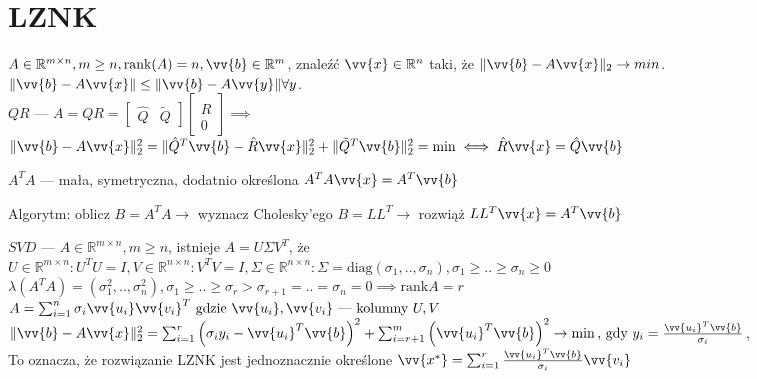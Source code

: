 \section{LZNK}
$A \in \mathbb{R}^{m \times n},m \ge n, \text{rank}(A)=n, \vv{b} \in \mathbb{R}^m$, znaleźć $\vv{x} \in \mathbb{R}^n$ taki, że $\lVert \vv{b} - A\vv{x} \rVert_2 \to min$.\\
$\lVert \vv{b} - A\vv{x} \rVert \le \lVert \vv{b} - A\vv{y} \rVert \forall y$.\\
\entry
$QR$ ---
$
A = QR = 
\begin{bmatrix}
  \hat{Q} & \tilde{Q}
\end{bmatrix}
\begin{bmatrix}
  \hat{R}
  \\
  0
\end{bmatrix}
\implies$\\
$
\lVert \vv{b} - A\vv{x} \rVert_2^2 =
\lVert \hat{Q}^T \vv{b} - \hat{R} \vv{x} \rVert_2^2 + \lVert \tilde{Q}^T \vv{b} \rVert_2^2 = \min \iff
\hat{R}\vv{x} = \hat{Q}\vv{b}
$

\entry
$A^TA$ ---
mała, symetryczna, dodatnio określona
$A^TA \vv{x} = A^T \vv{b}$

\entry
Algorytm:
oblicz $B = A^TA \rightarrow$
wyznacz Cholesky'ego $B = LL^T \rightarrow$
rozwiąż $LL^T\vv{x} = A^T \vv{b}$

\entry
$SVD$ ---
$A \in \mathbb{R}^{m \times n}, m \ge n$, istnieje
$A = U \Sigma V^T$, że\\
$
U \in \mathbb{R}^{m \times n}: U^TU = I,
V \in \mathbb{R}^{n \times n}: V^TV = I,
\Sigma \in \mathbb{R}^{n \times n}: \Sigma = \text{diag}\left(\sigma_1, .., \sigma_n\right),
\sigma_1 \ge .. \ge \sigma_n \ge 0
$\\
$
\lambda(A^TA) = (\sigma_1^2, .., \sigma_n^2),
\sigma_1 \ge .. \ge \sigma_r > \sigma_{r+1}=..=\sigma_n = 0 \implies \text{rank}{A} = r
$\\
$ A = \sum_{i=1}^n \sigma_i \vv{u_i} \vv{v_i}^T \text{ gdzie }\vv{u_i},\vv{v_i} \text{ --- kolumny } U,V $\\
$ \lVert \vv{b} - A \vv{x} \rVert_2^2 = \sum_{i=1}^r \left( \sigma_i y_i - \vv{u_i}^T \vv{b} \right)^2 + \sum_{i=r+1}^m \left( \vv{u_i}^T \vv{b} \right)^2 \rightarrow
\min \text{, gdy } y_i = \frac{\vv{u_i}^T \vv{b}}{\sigma_i} $,\\
To oznacza, że rozwiązanie LZNK jest jednoznacznie określone
$\vv{x^*} = \sum_{i=1}^r \frac{\vv{u_i}^T \vv{b}}{\sigma_i}\vv{v_i}$
